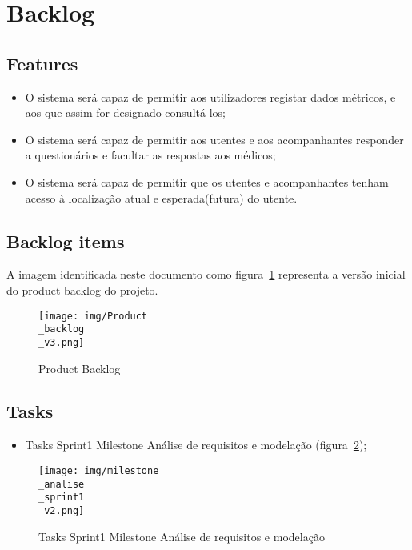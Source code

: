 
\section{Backlog}


\subsection{Features}

\begin{minipage}{\linewidth}
\begin{itemize}
	\item O sistema será capaz de permitir aos utilizadores registar dados métricos, e aos que assim for designado consultá-los;
	\item O sistema será capaz de permitir aos utentes e aos acompanhantes responder a questionários e facultar as respostas aos médicos;
	\item O sistema será capaz de permitir que os utentes e acompanhantes tenham acesso à localização atual e esperada(futura) do utente. 
\end{itemize}
\end{minipage}


\subsection{Backlog items}
A imagem identificada neste documento como figura~\ref{fig:pb3180} representa a versão inicial do product backlog do projeto.

\begin{figure}[htb]
	\centering
	\texttt{[image: img/Product\\\_backlog\\\_v3.png]}  %
	\caption{Product Backlog}
	\label{fig:pb3180}
\end{figure}


\subsection{Tasks}

\begin{minipage}{\linewidth}
\begin{itemize}
	\item Tasks Sprint1 Milestone Análise de requisitos e modelação (figura~\ref{fig:task3181});
\end{itemize}
\end{minipage}

\begin{figure}[htb]
	\centering
	\texttt{[image: img/milestone\\\_analise\\\_sprint1\\\_v2.png]}  %
	\caption{Tasks Sprint1 Milestone Análise de requisitos e modelação}
	\label{fig:task3181}
\end{figure}

